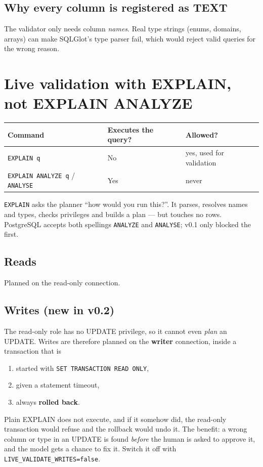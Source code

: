 \documentclass[11pt,a4paper]{article}
\begin{document}
\subsection*{Why every column is registered as TEXT}
The validator only needs column \emph{names}. Real type strings (enums,
domains, arrays) can make SQLGlot's type parser fail, which would reject
valid queries for the wrong reason.

\section{Live validation with EXPLAIN, not EXPLAIN ANALYZE}

\begin{center}
\begin{tabular}{@{}lll@{}}
\toprule
\textbf{Command} & \textbf{Executes the query?} & \textbf{Allowed?} \\
\midrule
\texttt{EXPLAIN q}                         & No  & yes, used for validation \\
\texttt{EXPLAIN ANALYZE q} / \texttt{ANALYSE} & Yes & never \\
\bottomrule
\end{tabular}
\end{center}

\texttt{EXPLAIN} asks the planner ``how would you run this?''. It parses,
resolves names and types, checks privileges and builds a plan --- but touches
no rows. PostgreSQL accepts both spellings \texttt{ANALYZE} and
\texttt{ANALYSE}; v0.1 only blocked the first.

\subsection*{Reads}
Planned on the read-only connection.

\subsection*{Writes (new in v0.2)}
The read-only role has no UPDATE privilege, so it cannot even \emph{plan}
an UPDATE. Writes are therefore planned on the \textbf{writer} connection,
inside a transaction that is
\begin{enumerate}[leftmargin=*]
  \item started with \texttt{SET TRANSACTION READ ONLY},
  \item given a statement timeout,
  \item always \textbf{rolled back}.
\end{enumerate}
Plain EXPLAIN does not execute, and if it somehow did, the read-only
transaction would refuse and the rollback would undo it. The benefit: a
wrong column or type in an UPDATE is found \emph{before} the human is asked to
approve it, and the model gets a chance to fix it.
Switch it off with \texttt{LIVE\_VALIDATE\_WRITES=false}.
\end{document}
